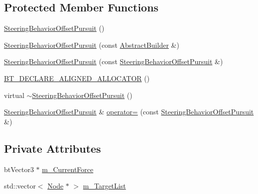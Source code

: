 \subsection*{Protected Member Functions}
\begin{DoxyCompactItemize}
\item 
\mbox{\hyperlink{classnjli_1_1_steering_behavior_offset_pursuit_a924f95fb19b7a44bd5f0a566d9daef2f}{Steering\+Behavior\+Offset\+Pursuit}} ()
\item 
\mbox{\hyperlink{classnjli_1_1_steering_behavior_offset_pursuit_a3e00c08af75f69ea9ca48a2c34a51c15}{Steering\+Behavior\+Offset\+Pursuit}} (const \mbox{\hyperlink{classnjli_1_1_abstract_builder}{Abstract\+Builder}} \&)
\item 
\mbox{\hyperlink{classnjli_1_1_steering_behavior_offset_pursuit_a4d3d1a7568dd997cb24103c7e0f022ad}{Steering\+Behavior\+Offset\+Pursuit}} (const \mbox{\hyperlink{classnjli_1_1_steering_behavior_offset_pursuit}{Steering\+Behavior\+Offset\+Pursuit}} \&)
\item 
\mbox{\hyperlink{classnjli_1_1_steering_behavior_offset_pursuit_aea059995e83200c15db5377238df76b2}{B\+T\+\_\+\+D\+E\+C\+L\+A\+R\+E\+\_\+\+A\+L\+I\+G\+N\+E\+D\+\_\+\+A\+L\+L\+O\+C\+A\+T\+OR}} ()
\item 
virtual \mbox{\hyperlink{classnjli_1_1_steering_behavior_offset_pursuit_a132a1d0265dd9a89ddda7640fb064064}{$\sim$\+Steering\+Behavior\+Offset\+Pursuit}} ()
\item 
\mbox{\hyperlink{classnjli_1_1_steering_behavior_offset_pursuit}{Steering\+Behavior\+Offset\+Pursuit}} \& \mbox{\hyperlink{classnjli_1_1_steering_behavior_offset_pursuit_a7f492f13e8e82c49ef536638b28e339c}{operator=}} (const \mbox{\hyperlink{classnjli_1_1_steering_behavior_offset_pursuit}{Steering\+Behavior\+Offset\+Pursuit}} \&)
\end{DoxyCompactItemize}
\subsection*{Private Attributes}
\begin{DoxyCompactItemize}
\item 
bt\+Vector3 $\ast$ \mbox{\hyperlink{classnjli_1_1_steering_behavior_offset_pursuit_afab51511b8d5a398b424da30723ce1fc}{m\+\_\+\+Current\+Force}}
\item 
std\+::vector$<$ \mbox{\hyperlink{classnjli_1_1_node}{Node}} $\ast$ $>$ \mbox{\hyperlink{classnjli_1_1_steering_behavior_offset_pursuit_a4b74fabcf3d8ef81079735964251b081}{m\+\_\+\+Target\+List}}
\end{DoxyCompactItemize}
